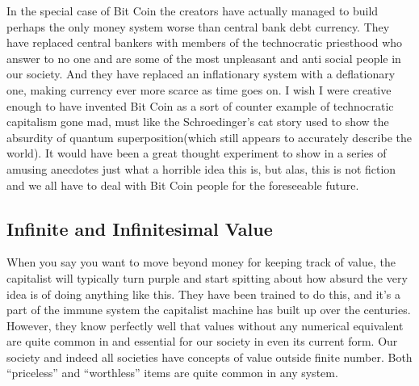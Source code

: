 In the special case of Bit Coin the creators have actually managed to
build perhaps the only money system worse than central bank debt
currency. They have replaced central bankers with members of the
technocratic priesthood who answer to no one and are some of the most
unpleasant and anti social people in our society. And they have replaced
an inflationary system with a deflationary one, making currency ever
more scarce as time goes on. I wish I were creative enough to have
invented Bit Coin as a sort of counter example of technocratic
capitalism gone mad, must like the Schroedinger's cat story used to show
the absurdity of quantum superposition(which still appears to accurately
describe the world). It would have been a great thought experiment to
show in a series of amusing anecdotes just what a horrible idea this is,
but alas, this is not fiction and we all have to deal with Bit Coin
people for the foreseeable future.

\subsection{Infinite and Infinitesimal
Value}\label{infinite-and-infinitesimal-value}

When you say you want to move beyond money for keeping track of value,
the capitalist will typically turn purple and start spitting about how
absurd the very idea is of doing anything like this. They have been
trained to do this, and it's a part of the immune system the capitalist
machine has built up over the centuries. However, they know perfectly
well that values without any numerical equivalent are quite common in
and essential for our society in even its current form. Our society and
indeed all societies have concepts of value outside finite number. Both
``priceless'' and ``worthless'' items are quite common in any system.


